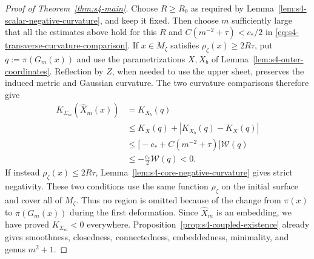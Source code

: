 \documentclass[a4paper,11pt,oneside,reqno]{amsart}
\numberwithin{equation}{section}
\theoremstyle{definition}
\begin{document}
\begin{proof}[Proof of Theorem~\ref{thm:s4-main}]
    Choose $R\geq R_0$ as required by
    Lemma~\ref{lem:s4-scalar-negative-curvature}, and keep
    it fixed. Then choose $m$ sufficiently large that
    all the estimates above hold for this $R$ and
    $C(m^{-2}+\tau)<c_*/2$ in
    \eqref{eq:s4-transverse-curvature-comparison}.
    If $x\in M_\zeta$ satisfies $\rho_\zeta(x)\geq2R\tau$,
    put $q:=\pi(G_m(x))$ and use the parametrizations
    $X,X_b$ of Lemma~\ref{lem:s4-outer-coordinates}.
    Reflection by $Z$, when needed to use the upper sheet,
    preserves the induced metric and Gaussian curvature.
    The two curvature comparisons therefore give
    \begin{align*}
        K_{\Sigma_m}(\widehat X_m(x))
        &=K_{X_b}(q)\\
        &\leq K_X(q)+|K_{X_b}(q)-K_X(q)|\\
        &\leq\bigl[-c_*+C(m^{-2}+\tau)\bigr]\mathcal W(q)\\
        &\leq-\frac{c_*}{2}\mathcal W(q)<0.
    \end{align*}
    If instead $\rho_\zeta(x)\leq2R\tau$,
    Lemma~\ref{lem:s4-core-negative-curvature} gives
    strict negativity. These two conditions use the same
    function $\rho_\zeta$ on the initial surface and cover
    all of $M_\zeta$. Thus no region is omitted because of
    the change from $\pi(x)$ to $\pi(G_m(x))$ during the
    first deformation. Since $\widehat X_m$ is an embedding,
    we have proved $K_{\Sigma_m}<0$ everywhere.
    Proposition~\ref{prop:s4-coupled-existence} already gives
    smoothness, closedness, connectedness, embeddedness,
    minimality, and genus $m^2+1$.


\end{proof}
\end{document}
